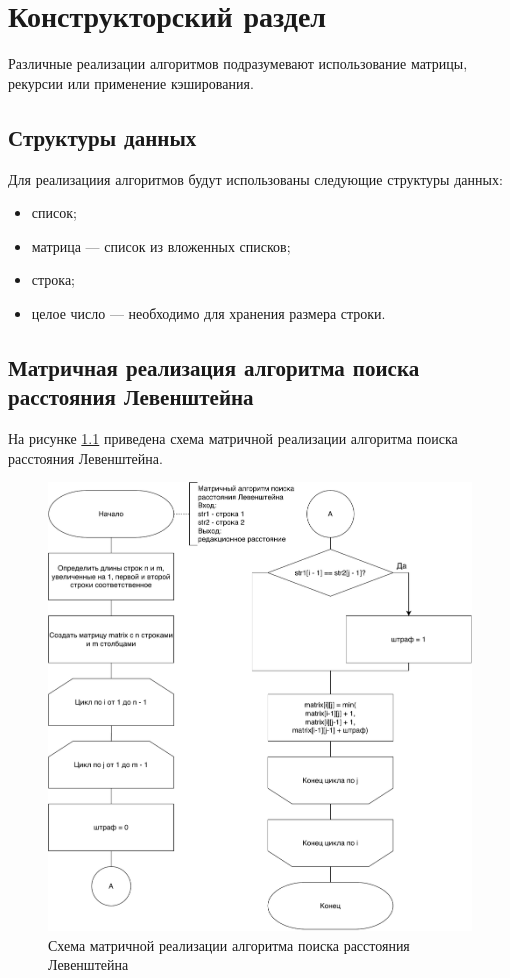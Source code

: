 \chapter{Конструкторский раздел}

Различные реализации алгоритмов подразумевают использование матрицы, рекурсии или применение кэширования.

\section{Структуры данных}

Для реализациия алгоритмов будут использованы следующие структуры данных:
\begin{itemize}
	\item список;
	\item матрица --- список из вложенных списков;
	\item строка;
	\item целое число --- необходимо для хранения размера строки.
\end{itemize}

\section{Матричная реализация алгоритма поиска расстояния Левенштейна}

На рисунке \ref{pic:lev} приведена схема матричной реализации алгоритма поиска расстояния Левенштейна.

\newpage

\begin{figure}[H]
	\centering
	\includegraphics[scale=0.62]{assets/lev.pdf}
	\caption{Схема матричной реализации алгоритма поиска расстояния Левенштейна}
	\label{pic:lev}
\end{figure}

